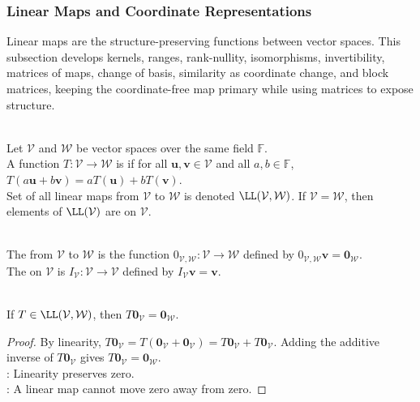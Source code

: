 \subsubsection{Linear Maps and Coordinate Representations}

Linear maps are the structure-preserving functions between vector spaces. This subsection develops kernels, ranges, rank-nullity, isomorphisms, invertibility, matrices of maps, change of basis, similarity as coordinate change, and block matrices, keeping the coordinate-free map primary while using matrices to expose structure.

\begin{definition} \label{def:linear-map} \\
Let $\mathcal{V}$ and $\mathcal{W}$ be vector spaces over the same field $\mathbb{F}$.\\
A function $T : \mathcal{V} \to \mathcal{W}$ is  if for all $\mathbf{u}, \mathbf{v} \in \mathcal{V}$ and all $a,b \in \mathbb{F}$, $T(a\mathbf{u} + b\mathbf{v}) = aT(\mathbf{u}) + bT(\mathbf{v})$.\\
Set of all linear maps from $\mathcal{V}$ to $\mathcal{W}$ is denoted $\LL(\mathcal{V}, \mathcal{W})$. If $\mathcal{V} = \mathcal{W}$, then elements of $\LL(\mathcal{V})$ are  on $\mathcal{V}$.
\end{definition}

\begin{definition} \\
The  from $\mathcal{V}$ to $\mathcal{W}$ is the function $0_{\mathcal{V},\mathcal{W}}:\mathcal{V}\to\mathcal{W}$ defined by $0_{\mathcal{V},\mathcal{W}}\mathbf{v}=\mathbf{0}_{\mathcal{W}}$.\\
The  on $\mathcal{V}$ is $I_{\mathcal{V}}:\mathcal{V}\to\mathcal{V}$ defined by $I_{\mathcal{V}}\mathbf{v}=\mathbf{v}$.
\end{definition}

\begin{proposition} \label{prop:linear-maps-send-zero-to-zero} \\
If $T\in\LL(\mathcal{V},\mathcal{W})$, then $T\mathbf{0}_{\mathcal{V}}=\mathbf{0}_{\mathcal{W}}$.
\begin{proof}
By linearity, $T\mathbf{0}_{\mathcal{V}}=T(\mathbf{0}_{\mathcal{V}}+\mathbf{0}_{\mathcal{V}})=T\mathbf{0}_{\mathcal{V}}+T\mathbf{0}_{\mathcal{V}}$. Adding the additive inverse of $T\mathbf{0}_{\mathcal{V}}$ gives $T\mathbf{0}_{\mathcal{V}}=\mathbf{0}_{\mathcal{W}}$.\\
: Linearity preserves zero.\\
: A linear map cannot move zero away from zero.
\end{proof}
\end{proposition}

